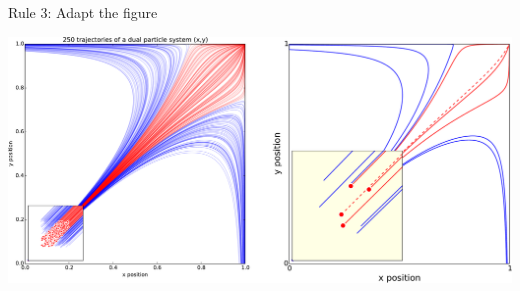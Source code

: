 \documentclass[10pt,aspectratio=169]{beamer}
\begin{document}
\begin{frame}{Rule 3: Adapt the figure}
  \begin{center}
    \includegraphics[width=\textwidth]{rule-3.pdf}
  \end{center} 
\end{frame}
\end{document}
